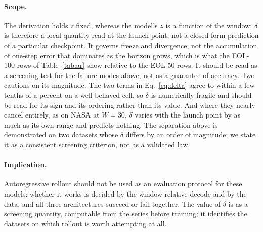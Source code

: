\paragraph{Scope.}
The derivation holds $z$ fixed, whereas the model's $z$ is a function of the
window; $\delta$ is therefore a local quantity read at the launch point, not a
closed-form prediction of a particular checkpoint. It governs freeze and
divergence, not the accumulation of one-step error that dominates as the horizon
grows, which is what the EOL-100 rows of Table~\ref{tab:ar} show relative to the
EOL-50 rows. It should be read as a screening test for the failure modes above,
not as a guarantee of accuracy. Two cautions on its magnitude. The two terms in
Eq.~\eqref{eq:delta} agree to within a few tenths of a percent on a well-behaved
cell, so $\delta$ is numerically fragile and should be read for its sign and its
ordering rather than its value. And where they nearly cancel entirely, as on
NASA at $W{=}30$, $\delta$ varies with the launch point by as much as its own
range and predicts nothing. The separation above is demonstrated on two datasets
whose $\delta$ differs by an order of magnitude; we state it as a consistent
screening criterion, not as a validated law.

\paragraph{Implication.}
Autoregressive rollout should not be used as an evaluation protocol for these
models: whether it works is decided by the window-relative decode and by the
data, and all three architectures succeed or fail together. The value of
$\delta$ is as a screening quantity, computable from the series before training;
it identifies the datasets on which rollout is worth attempting at all.
